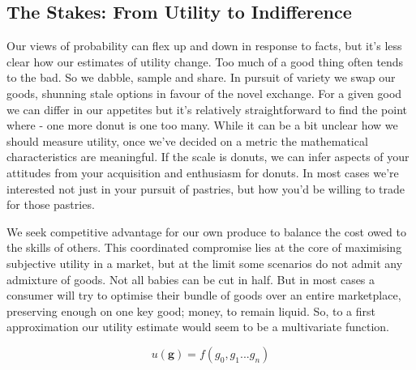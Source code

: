 \documentclass[]{tufte-book}
\theoremstyle{definition}
\theoremstyle{definition}
\theoremstyle{definition}
\theoremstyle{remark}
\begin{document}
\hypertarget{the-stakes-from-utility-to-indifference}{%
\subsection{The Stakes: From Utility to Indifference}\label{the-stakes-from-utility-to-indifference}}

Our views of probability can flex up and down in response to facts, but it's less clear how our estimates of utility change. Too much of a good thing often tends to the bad. So we dabble, sample and share. In pursuit of variety we swap our goods, shunning stale options in favour of the novel exchange. For a given good we can differ in our appetites but it's relatively straightforward to find the point where - one more donut is one too many. While it can be a bit unclear how we should measure utility, once we've decided on a metric the mathematical characteristics are meaningful. If the scale is donuts, we can infer aspects of your attitudes from your acquisition and enthusiasm for donuts. In most cases we're interested not just in your pursuit of pastries, but how you'd be willing to trade for those pastries.

We seek competitive advantage for our own produce to balance the cost owed to the skills of others. This coordinated compromise lies at the core of maximising subjective utility in a market, but at the limit some scenarios do not admit any admixture of goods. Not all babies can be cut in half. But in most cases a consumer will try to optimise their bundle of goods over an entire marketplace, preserving enough on one key good; money, to remain liquid. So, to a first approximation our utility estimate would seem to be a multivariate function.

\[ u(\mathbf{g}) = f(g_{0}, g_{1} ... g_{n}) \]
\end{document}

